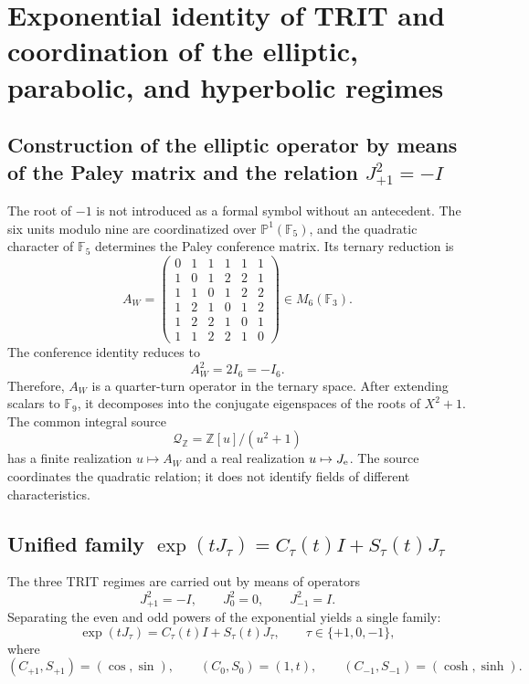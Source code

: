 \label{chap:83-11}

\section{Exponential identity of TRIT and coordination of the elliptic, parabolic, and hyperbolic regimes}

\subsection{Construction of the elliptic operator by means of the Paley matrix and the relation \texorpdfstring{\(J_{+1}^{2}=-I\)}{J² = -I}}

The root of \(-1\) is not introduced as a formal symbol without an
antecedent. The six units modulo nine are coordinatized over
\(\mathbb P^1(\mathbb F_5)\), and the quadratic character of \(\mathbb F_5\) determines the
Paley conference matrix. Its ternary reduction is
\[
 A_W=
 \begin{pmatrix}
 0&1&1&1&1&1\\
 1&0&1&2&2&1\\
 1&1&0&1&2&2\\
 1&2&1&0&1&2\\
 1&2&2&1&0&1\\
 1&1&2&2&1&0
 \end{pmatrix}\in M_6(\mathbb F_3).
\]
The conference identity reduces to
\begin{equation}\label{p12-83-c11-s1:eq:constantes-raiz-interna-menos-uno}
 \boxed{A_W^2=2I_6=-I_6.}
\end{equation}
Therefore, \(A_W\) is a quarter-turn operator in the ternary space.
After extending scalars to \(\mathbb F_9\), it decomposes into the conjugate
eigenspaces of the roots of \(X^2+1\). The common integral source
\[
 \mathcal Q_{\mathbb Z}=\mathbb Z[u]/(u^2+1)
\]
has a finite realization \(u\mapsto A_W\) and a real realization
\(u\mapsto J_{\rm e}\). The source coordinates the quadratic relation; it does not
identify fields of different characteristics.

\subsection{Unified family \texorpdfstring{\(\exp(tJ_\tau)=C_\tau(t)I+S_\tau(t)J_\tau\)}{exp(t J tau) = C tau(t) I + S tau(t) J tau}}

The three TRIT regimes are carried out by means of operators
\[
 J_{+1}^2=-I,\qquad J_0^2=0,\qquad J_{-1}^2=I.
\]
Separating the even and odd powers of the exponential yields a single family:
\begin{equation}\label{p12-83-c11-s1:eq:constantes-euler-extendido}
 \boxed{
 \exp(tJ_\tau)=C_\tau(t)I+S_\tau(t)J_\tau,
 \qquad \tau\in\{+1,0,-1\},}
\end{equation}
where
\[
 (C_{+1},S_{+1})=(\cos,\sin),\qquad
 (C_0,S_0)=(1,t),\qquad
 (C_{-1},S_{-1})=(\cosh,\sinh).
\]
